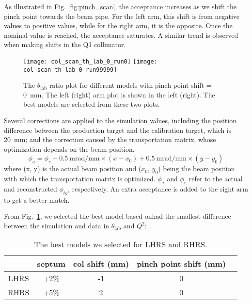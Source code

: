 As illustrated in Fig. \ref{fig:pinch_scan}, the acceptance increases as we shift the pinch point towards the beam pipe. For the left arm, this shift is from negative values to positive values, while for the right arm, it is the opposite. Once the nominal value is reached, the acceptance saturates.
A similar trend is observed when making shifts in the Q1 collimator.
\begin{figure}[H]
    \centering
    \texttt{[image: col\_scan\_th\_lab\_0\_run0]}
    \texttt{[image: col\_scan\_th\_lab\_0\_run99999]}
    \caption[Theta ratio plot]
    {The $\theta_{\text{lab}}$ ratio plot for different models with 
    pinch point shift = 0~mm. The left (right) arm plot is shown in the left (right).
    The best models are selected from these two plots.}
    \label{fig:best_model}
\end{figure}

Several corrections are applied to the simulation values, including the position
difference between the production target and the calibration target, which is
20~mm; and the correction caused by
the transportation matrix, whose optimization depends on the beam position.
\begin{equation}
    \phi_a = \phi_r + 0.5\ \text{mrad/mm} \times (x - x_0) + 0.5\ \text{mrad/mm} \times (y - y_0)
\end{equation}
where (x, y) is the actual beam position and ($x_0$, $y_0$) being the beam position
with which the transportation matrix is optimized. $\phi_a$ and $\phi_r$ refer
to the actual and reconstructed $\phi_{tg}$, respectively. 
An extra acceptance is added to the right arm to get a better match.

From Fig.~\ref{fig:best_model}, 
we selected the best model based onhad the smallest difference
between the simulation and data in $\theta_{\text{lab}}$ and $Q^2$:
\begin{table}[!h]
    \centering
    \begin{tabular}{c | c c c c}
	\hline
	    & septum & col shift (mm)	& pinch point shift (mm)	\\
	\hline
	LHRS	& +2\%	& -1	& 0 \\
	RHRS	& +5\%	& 2	& 0 \\
	\hline
    \end{tabular}
    \caption{The best models we selected for LHRS and RHRS.}
\end{table}

